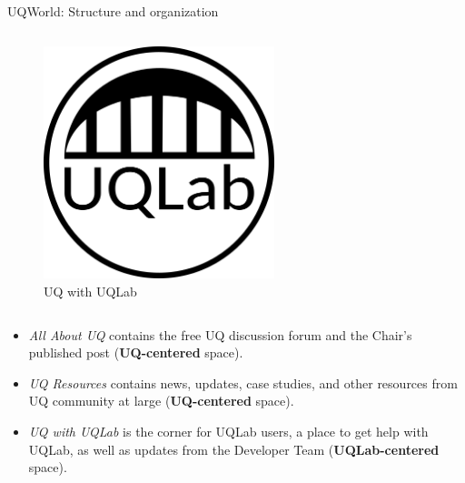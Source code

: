 \documentclass[]{rsuqbeamernew}
\begin{document}
\begin{frame}[t]{UQWorld: Structure and organization}
\begin{columns}
  \begin{figure}
    \includegraphics[width=0.6\textwidth]{../figures/uq_with_uqlab_512}
    \caption*{UQ with UQLab}
  \end{figure}
\end{columns}

\begin{itemize}
  \item \emph{All About UQ} contains the free UQ discussion forum and the Chair's published post (\textbf{UQ-centered} space).
  \item \emph{UQ Resources} contains news, updates, case studies, and other resources from UQ community at large (\textbf{UQ-centered} space).
  \item \emph{UQ with UQLab} is the corner for UQLab users, a place to get help with UQLab, as well as updates from the Developer Team (\textbf{UQLab-centered} space).
\end{itemize}

\end{frame}
\end{document}
